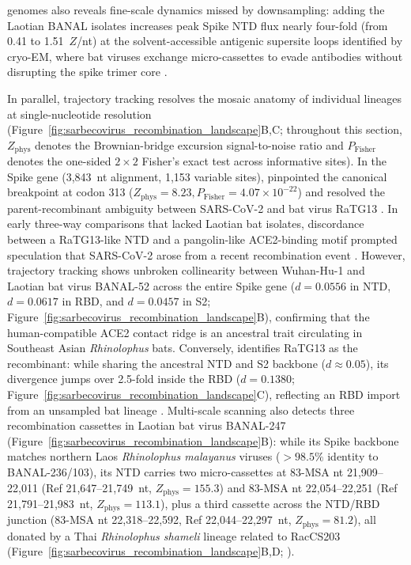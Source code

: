 genomes also reveals fine-scale dynamics missed by downsampling: adding the Laotian BANAL isolates increases peak Spike NTD flux nearly four-fold (from 0.41 to 1.51~$Z$/nt) at the solvent-accessible antigenic supersite loops identified by cryo-EM, where bat viruses exchange micro-cassettes to evade antibodies without disrupting the spike trimer core \citep{mccallum2021n}.

In parallel, trajectory tracking resolves the mosaic anatomy of individual lineages at single-nucleotide resolution (Figure~\ref{fig:sarbecovirus_recombination_landscape}B,C; throughout this section, $Z_{\mathrm{phys}}$ denotes the Brownian-bridge excursion signal-to-noise ratio and $P_{\mathrm{Fisher}}$ denotes the one-sided $2\times 2$ Fisher's exact test across informative sites). In the Spike gene (3,843~nt alignment, 1,153 variable sites), \RhizAeon pinpointed the canonical breakpoint at codon 313 ($Z_{\mathrm{phys}} = 8.23, P_{\mathrm{Fisher}} = 4.07 \times 10^{-22}$) and resolved the parent-recombinant ambiguity between SARS-CoV-2 and bat virus RaTG13 \citep{boni2020evolutionary}. In early three-way comparisons that lacked Laotian bat isolates, discordance between a RaTG13-like NTD and a pangolin-like ACE2-binding motif prompted speculation that SARS-CoV-2 arose from a recent recombination event \citep{Li2020-nd,Wrobel2020-tg}. However, trajectory tracking shows unbroken collinearity between Wuhan-Hu-1 and Laotian bat virus BANAL-52 across the entire Spike gene ($d = 0.0556$ in NTD, $d = 0.0617$ in RBD, and $d = 0.0457$ in S2; Figure~\ref{fig:sarbecovirus_recombination_landscape}B), confirming that the human-compatible ACE2 contact ridge is an ancestral trait circulating in Southeast Asian \textit{Rhinolophus} bats. Conversely, \RhizAeon identifies RaTG13 as the recombinant: while sharing the ancestral NTD and S2 backbone ($d \approx 0.05$), its divergence jumps over 2.5-fold inside the RBD ($d = 0.1380$; Figure~\ref{fig:sarbecovirus_recombination_landscape}C), reflecting an RBD import from an unsampled bat lineage \citep{boni2020evolutionary}. Multi-scale scanning also detects three recombination cassettes in Laotian bat virus BANAL-247 (Figure~\ref{fig:sarbecovirus_recombination_landscape}B): while its Spike backbone matches northern Laos \textit{Rhinolophus malayanus} viruses ($>98.5\%$ identity to BANAL-236/103), its NTD carries two micro-cassettes at 83-MSA nt 21,909--22,011 (Ref 21,647--21,749~nt, $Z_{\mathrm{phys}} = 155.3$) and 83-MSA nt 22,054--22,251 (Ref 21,791--21,983~nt, $Z_{\mathrm{phys}} = 113.1$), plus a third cassette across the NTD/RBD junction (83-MSA nt 22,318--22,592, Ref 22,044--22,297~nt, $Z_{\mathrm{phys}} = 81.2$), all donated by a Thai \textit{Rhinolophus shameli} lineage related to RacCS203 (Figure~\ref{fig:sarbecovirus_recombination_landscape}B,D; \citealt{wacharapluesadee2021evidence}).

